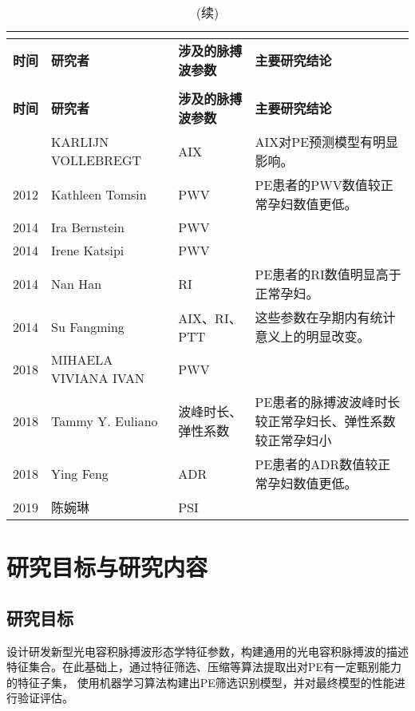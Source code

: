 \begin{center}
	\begin{longtable}{m{1cm}<{\centering}m{3cm}<{\centering}m{3.5cm}<{\centering}m{6.5cm}<{\centering}}
		\caption{基于脉搏波的PE研究小结}\\
		\label{tab:PPGinPE}\\
        \toprule
        \textbf{时间}&\textbf{研究者}&\textbf{涉及的脉搏波参数}&\textbf{主要研究结论}\\
        \midrule
        \endfirsthead
        \caption[]{(续)}\\
        \midrule
        \textbf{时间}&\textbf{研究者}&\textbf{涉及的脉搏波参数}&\textbf{主要研究结论}\\
        \midrule
        \endhead 
        \midrule
        \endfoot
        \bottomrule
        \endlastfoot
        2008    &   KARLIJN VOLLEBREGT\cite{KARLIJN2008}    &   AIX     &   AIX对PE预测模型有明显影响。\\
        2012    &   Kathleen Tomsin\cite{Tomsin2012}    &   PWV     &   PE患者的PWV数值较正常孕妇数值更低。 \\
        2014    &   Ira Bernstein\cite{Ira2014}     &   PWV &   \\
        2014    &   Irene Katsipi\cite{Katsipi2014}     &   PWV &   \\
        2014    &   Nan Han\cite{Han2014}     &   RI &  PE患者的RI数值明显高于正常孕妇。 \\
        2014    &   Su Fangming\cite{Su2014}    &   AIX、RI、PTT    &   这些参数在孕期内有统计意义上的明显改变。\\
        2018    &   MIHAELA VIVIANA IVAN\cite{VivianaIvan2018}     &   PWV &   \\
        2018    &   Tammy Y. Euliano\cite{Euliano2018}     &   波峰时长、弹性系数 &   PE患者的脉搏波波峰时长较正常孕妇长、弹性系数较正常孕妇小\\
        2018    &   Ying Feng\cite{Feng2018}    &   ADR &  PE患者的ADR数值较正常孕妇数值更低。 \\
        2019    &   陈婉琳\cite{Chen2019}     &   PSI &   \\
	\end{longtable}
\end{center}

\section{研究目标与研究内容}

\subsection{研究目标}
设计研发新型光电容积脉搏波形态学特征参数，构建通用的光电容积脉搏波的描述特征集合。在此基础上，通过特征筛选、压缩等算法提取出对PE有一定甄别能力的特征子集，
使用机器学习算法构建出PE筛选识别模型，并对最终模型的性能进行验证评估。
